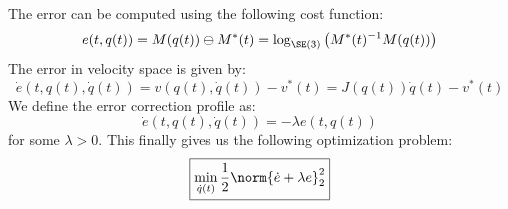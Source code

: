 The error can be computed using the following cost function:
\begin{equation*}
    e(t, q(t)) = M(q(t)) \ominus M^*(t) = \log_{\SE(3)}\left(M^*(t)^{-1}M(q(t))\right)
\end{equation*}
The error in velocity space is given by:
\begin{equation*}
    \dot{e}(t, q(t), \dot{q}(t)) = v(q(t), \dot{q}(t)) - v^*(t) = J(q(t))\dot{q}(t) - v^*(t)
\end{equation*}
We define the error correction profile as:
\begin{equation*}
    \dot{e}(t, q(t), \dot{q}(t)) = -\lambda e(t, q(t))
\end{equation*}
for some $\lambda>0$. This finally gives us the following optimization problem:
\begin{equation}
    \boxed{\min_{\dot{q}(t)} \frac{1}{2}\norm{\dot{e}+\lambda e}_2^2}
\end{equation}